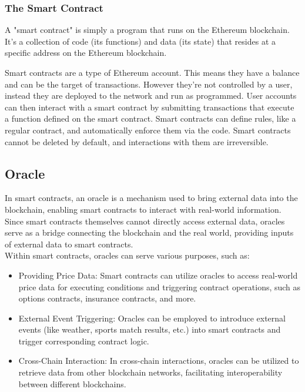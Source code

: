 \documentclass{article}
\begin{document}
\subsubsection{The Smart Contract}
A "smart contract" is simply a program that runs on the Ethereum blockchain. It's a collection of code (its functions) and data (its state) that resides at a specific address on the Ethereum blockchain.
\par Smart contracts are a type of Ethereum account. This means they have a balance and can be the target of transactions. However they're not controlled by a user, instead they are deployed to the network and run as programmed. User accounts can then interact with a smart contract by submitting transactions that execute a function defined on the smart contract. Smart contracts can define rules, like a regular contract, and automatically enforce them via the code. Smart contracts cannot be deleted by default, and interactions with them are irreversible.
\subsection{Oracle}
In smart contracts, an oracle is a mechanism used to bring external data into the blockchain, enabling smart contracts to interact with real-world information. Since smart contracts themselves cannot directly access external data, oracles serve as a bridge connecting the blockchain and the real world, providing inputs of external data to smart contracts.\cite{oralce}\\
Within smart contracts, oracles can serve various purposes, such as:
\begin{itemize}
    \item Providing Price Data: Smart contracts can utilize oracles to access real-world price data for executing conditions and triggering contract operations, such as options contracts, insurance contracts, and more.
    \item External Event Triggering: Oracles can be employed to introduce external events (like weather, sports match results, etc.) into smart contracts and trigger corresponding contract logic.
    \item Cross-Chain Interaction: In cross-chain interactions, oracles can be utilized to retrieve data from other blockchain networks, facilitating interoperability between different blockchains.
\end{itemize}
\end{document}
